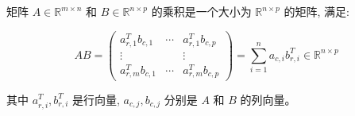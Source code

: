 \begin{definition}[矩阵和矩阵的乘法] \label{def:mat-mat-multi}
    
矩阵 $A \in \mathbb{R}^{m \times n}$ 和 $B \in \mathbb{R}^{n \times p}$ 的乘积是一个大小为 $\mathbb{R}^{n \times p}$ 的矩阵, 满足:

$$
A B=\left(\begin{array}{ccc}
a_{r, 1}^T b_{c, 1} & \cdots & a_{r, 1}^T b_{c, p} \\
\vdots & & \vdots \\
a_{r, m}^T b_{c, 1} & \cdots & a_{r, m}^T b_{c, p}
\end{array}\right)=\sum_{i=1}^n a_{c, i} b_{r, i}^T \in \mathbb{R}^{n \times p}
$$

其中 $a_{r, i}^T, b_{r, i}^T$ 是行向量, $a_{c, j}, b_{c, j}$ 分别是 $A$ 和 $B$ 的列向量。
\end{definition}

